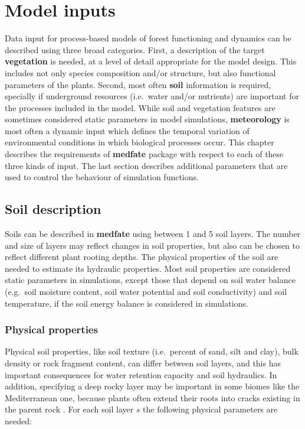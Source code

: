 \documentclass[]{book}
\begin{document}
\chapter{Model inputs}\label{model-inputs}

Data input for process-based models of forest functioning and dynamics
can be described using three broad categories. First, a description of
the target \textbf{vegetation} is needed, at a level of detail
appropriate for the model design. This includes not only species
composition and/or structure, but also functional parameters of the
plants. Second, most often \textbf{soil} information is required,
specially if underground resources (i.e.~water and/or nutrients) are
important for the processes included in the model. While soil and
vegetation features are sometimes considered static parameters in model
simulations, \textbf{meteorology} is most often a dynamic input which
defines the temporal variation of environmental conditions in which
biological processes occur. This chapter describes the requirements of
\textbf{medfate} package with respect to each of these three kinds of
input. The last section describes additional parameters that are used to
control the behaviour of simulation functions.

\section{Soil description}\label{soil-description}

Soils can be described in \textbf{medfate} using between 1 and 5 soil
layers. The number and size of layers may reflect changes in soil
properties, but also can be chosen to reflect different plant rooting
depths. The physical properties of the soil are needed to estimate its
hydraulic properties. Most soil properties are considered static
parameters in simulations, except those that depend on soil water
balance (e.g.~soil moisture content, soil water potential and soil
conductivity) and soil temperature, if the soil energy balance is
considered in simulations.

\subsection{Physical properties}\label{physical-properties}

Physical soil properties, like soil texture (i.e.~percent of sand, silt
and clay), bulk density or rock fragment content, can differ between
soil layers, and this has important consequences for water retention
capacity and soil hydraulics. In addition, specifying a deep rocky layer
may be important in some biomes like the Mediterranean one, because
plants often extend their roots into cracks existing in the parent rock
\citep{Ruffault2013}. For each soil layer \(s\) the following physical
parameters are needed:
\end{document}
